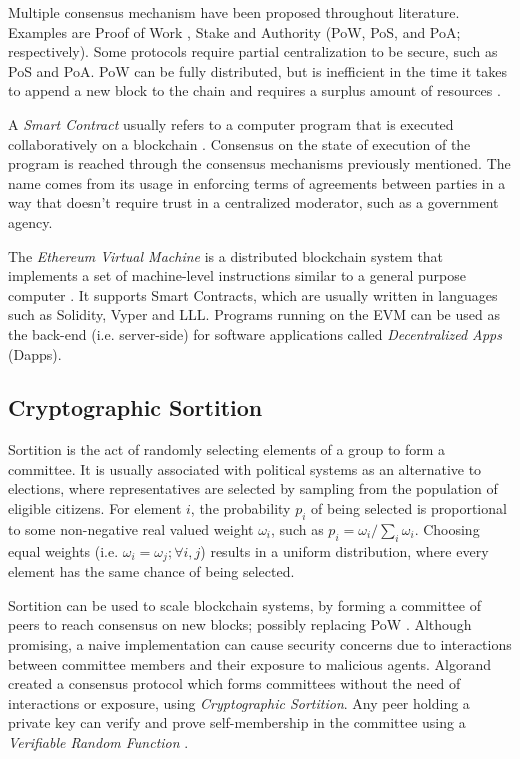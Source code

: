 \documentclass[conference]{IEEEtran}
\begin{document}
Multiple consensus mechanism have been proposed throughout literature. Examples are Proof of Work \cite{dwork1992pricing}, Stake \cite{king2012ppcoin} and Authority \cite{de2018pbft} (PoW, PoS, and PoA; respectively). Some protocols require partial centralization to be secure, such as PoS and PoA. PoW can be fully distributed, but is inefficient in the time it takes to append a new block to the chain and requires a surplus amount of resources \cite{dwork1992pricing}.

A \emph{Smart Contract} usually refers to a computer program that is executed collaboratively on a blockchain \cite{szabo1997idea}. Consensus on the state of execution of the program is reached through the consensus mechanisms previously mentioned. The name comes from its usage in enforcing terms of agreements between parties in a way that doesn't require trust in a centralized moderator, such as a government agency.

The \emph{Ethereum Virtual Machine} is a distributed blockchain system that implements a set of machine-level instructions similar to a general purpose computer \cite{wood2014ethereum}. It supports Smart Contracts, which are usually written in languages such as Solidity, Vyper and LLL. Programs running on the EVM can be used as the back-end (i.e. server-side) for software applications called \emph{Decentralized Apps} (Dapps).

\subsection{Cryptographic Sortition}
Sortition is the act of randomly selecting elements of a group to form a committee. It is usually associated with political systems as an alternative to elections, where representatives are selected by sampling from the population of eligible citizens. For element $i$, the probability $p_i$ of being selected is proportional to some non-negative real valued weight $\omega_i$, such as $p_i = \omega_i/\sum_i\omega_i$. Choosing equal weights (i.e. $\omega_i = \omega_j; \forall i,j$) results in a uniform distribution, where every element has the same chance of being selected.

Sortition can be used to scale blockchain systems, by forming a committee of peers to reach consensus on new blocks; possibly replacing PoW \cite{gilad2017algorand}. Although promising, a naive implementation can cause security concerns due to interactions between committee members and their exposure to malicious agents. Algorand \cite{gilad2017algorand} created a consensus protocol which forms committees without the need of interactions or exposure, using \emph{Cryptographic Sortition}. Any peer holding a private key can verify and prove self-membership in the committee using a \emph{Verifiable Random Function} \cite{micali1999verifiable}.
\end{document}
